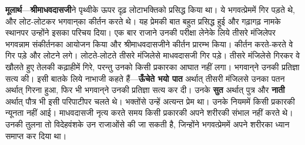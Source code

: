 \begin{sloppypar}\justifying{}
\textbf{मूलार्थ}—\textbf{श्रीमाधवदासजी}ने पृथ्वीके ऊपर दृढ़ लोटा\-भक्तिको प्रसिद्ध किया था। ये भगवत्प्रेममें गिर पड़ते थे, और लोट-लोटकर भगवान्‌का कीर्तन करते थे। यह प्रेमकी बात बहुत प्रसिद्ध हुई और गढ़ागढ़ नामके स्थानपर उन्होंने इसका परिचय दिया। एक बार राजाने उनकी परीक्षा लेनेके लिये तीसरे मंजिलेपर भगवन्नाम संकीर्तनका आयोजन किया और श्रीमाधवदासजीने कीर्तन प्रारम्भ किया। कीर्तन करते-करते वे गिर पड़े और लोटने लगे। लोटते-लोटते तीसरे मंजिलेसे माधवदासजी गिर पड़े। तीसरे मंजिलेसे गिरकर वे खौलते हुए तेलकी कढ़ाहीमें गिरे, परन्तु उनको किसी प्रकारका आघात नहीं लगा। भगवान्‌ने उनकी प्रतिज्ञा सत्य की। इसी बातके लिये नाभाजी कहते हैं—\textbf{ऊँचेते भयो पात} अर्थात् तीसरी मंजिलसे उनका पतन अर्थात् गिरना हुआ, फिर भी भगवान्‌ने उनकी प्रतिज्ञा सत्य कर दी। उनके \textbf{सुत} अर्थात् पुत्र और \textbf{नाती} अर्थात् पौत्र भी इसी परिपाटीपर चलते थे। भक्तोंसे उन्हें अत्यन्त प्रेम था। उनके नियममें किसी प्रकारकी न्यूनता नहीं आई। माधवदासजी नृत्य करते समय किसी प्रकारकी अपने शरीरकी संभाल नहीं करते थे। उनकी तुलना तो विदेह\-वंशके उन राजाओंसे की जा सकती है, जिन्होंने भगवत्प्रेममें अपने शरीरका ध्यान समाप्त कर दिया था।
\end{sloppypar}


